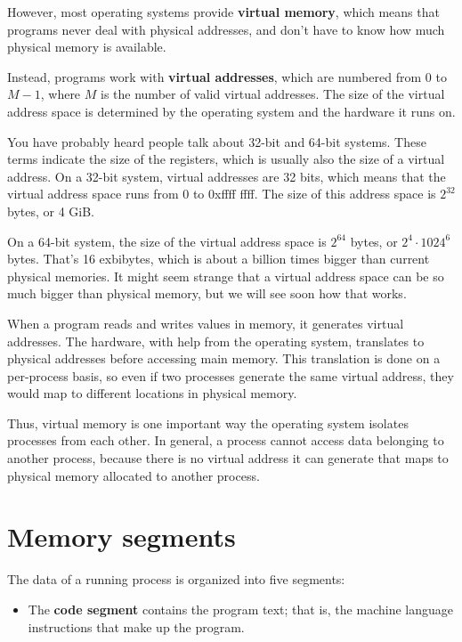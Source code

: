 \documentclass[12pt]{book}
\begin{document}
{However, most operating systems provide {\bf virtual memory}, which
means that programs never deal with physical addresses, and don't 
have to know how much physical memory is available.

Instead, programs work with {\bf virtual addresses}, which are numbered
from 0 to $M-1$, where $M$ is the number of valid virtual addresses.
The size of the virtual address space is determined by the operating
system and the hardware it runs on.

You have probably heard people talk about 32-bit and 64-bit systems.
These terms indicate the size of the registers, which is usually also
the size of a virtual address.  On a 32-bit system, virtual addresses
are 32 bits, which means that the virtual address space runs from 0 to
0xffff ffff.  The size of this address space is $2^{32}$ bytes, or 4
GiB.

On a 64-bit system, the size of the virtual address space is $2^{64}$
bytes, or $2^4 \cdot 1024^6$ bytes.  That's 16 exbibytes, which is
about a billion times bigger than current physical memories.  It might
seem strange that a virtual address space can be so much bigger
than physical memory, but we will see soon how that works.

When a program reads and writes values in memory, it generates virtual
addresses.  The hardware, with help from the operating system,
translates to physical addresses before accessing main memory.  This
translation is done on a per-process basis, so even if two processes
generate the same virtual address, they would map to different
locations in physical memory.

Thus, virtual memory is one important way the operating system
isolates processes from each other.  In general, a process cannot
access data belonging to another process, because there is no
virtual address it can generate that maps to physical memory
allocated to another process.



\section{Memory segments}

The data of a running process is organized into five segments:

\begin{itemize}

\item The {\bf code segment} contains the program text; that is, the
  machine language instructions that make up the program.


\end{itemize}}
\end{document}
